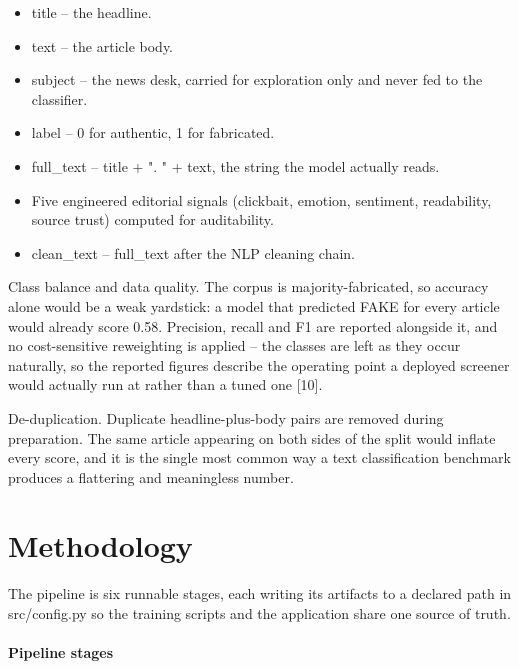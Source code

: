 \documentclass[conference,a4paper]{IEEEtran}
\begin{document}
\begin{itemize}
  \item title -- the headline.
  \item text -- the article body.
  \item subject -- the news desk, carried for exploration only and never fed to the classifier.
  \item label -- 0 for authentic, 1 for fabricated.
  \item full\_text -- title + ". " + text, the string the model actually reads.
  \item Five engineered editorial signals (clickbait, emotion, sentiment, readability, source trust) computed for auditability.
  \item clean\_text -- full\_text after the NLP cleaning chain.
\end{itemize}

Class balance and data quality. The corpus is majority-fabricated, so accuracy alone would be a weak yardstick: a model that predicted FAKE for every article would already score 0.58. Precision, recall and F1 are reported alongside it, and no cost-sensitive reweighting is applied -- the classes are left as they occur naturally, so the reported figures describe the operating point a deployed screener would actually run at rather than a tuned one [10].

De-duplication. Duplicate headline-plus-body pairs are removed during preparation. The same article appearing on both sides of the split would inflate every score, and it is the single most common way a text classification benchmark produces a flattering and meaningless number.

\section{Methodology}

The pipeline is six runnable stages, each writing its artifacts to a declared path in src/config.py so the training scripts and the application share one source of truth.

\paragraph{Pipeline stages}
\end{document}
